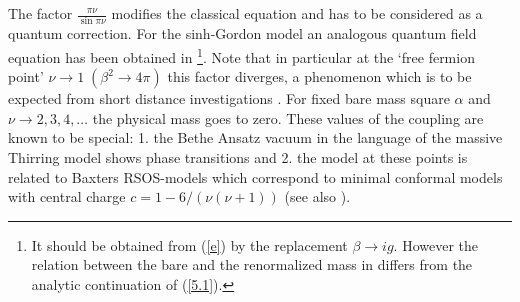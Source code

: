 \documentclass[a4paper,a4paper]{article}
\def\endproof{\mbox{\ \rule{.1in}{.1in}}}
\begin{document}

The factor $\frac{\pi \nu }{\sin \pi \nu }$ modifies the classical equation
and has to be considered as a quantum correction. For the sinh-Gordon model
an analogous quantum field equation has been obtained in \cite{MS}\footnote{%
It should be obtained from (\ref{e}) by the replacement $\beta \rightarrow
ig $. However the relation between the bare and the renormalized mass in 
\cite{MS} differs from the analytic continuation of (\ref{5.1}).}. Note that
in particular at the `free fermion point' $\nu \rightarrow 1\;(\beta
^{2}\rightarrow 4\pi )$ this factor diverges, a phenomenon which is to be
expected from short distance investigations \cite{ST}. For fixed bare mass
square $\alpha $ and $\nu \rightarrow 2,3,4,\dots $ the physical mass goes
to zero. These values of the coupling are known to be special: 1. the Bethe
Ansatz vacuum in the language of the massive Thirring model shows phase
transitions \cite{Ko} and 2. the model at these points is related \cite
{K3,LeC,Sm2} to Baxters RSOS-models which correspond to minimal conformal
models with central charge $c=1-6/(\nu (\nu +1))$ (see also \cite{MS}).
\end{document}
